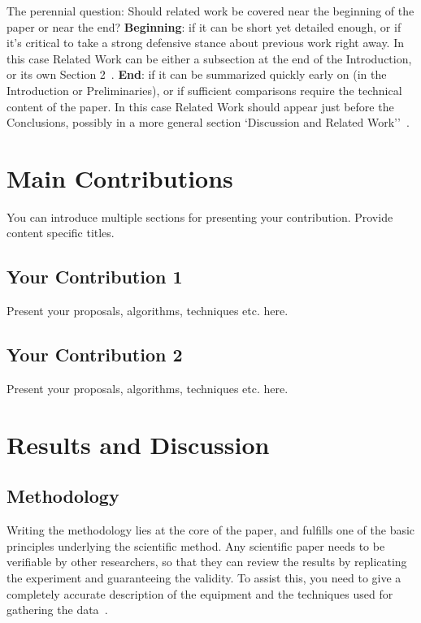 \documentclass{winslabreport}
\begin{document}
The perennial question: Should related work be covered near the beginning of the paper or near the end?
\textbf{Beginning}: if it can be short yet detailed enough, or if it's critical to take a strong defensive stance about previous work right away. In this case Related Work can be either a subsection at the end of the Introduction, or its own Section 2~\cite{Widom2006}. \textbf{End}: if it can be summarized quickly early on (in the Introduction or Preliminaries), or if sufficient comparisons require the technical content of the paper. In this case Related Work should appear just before the Conclusions, possibly in a more general section `Discussion and Related Work''~\cite{Widom2006}.


\section{Main Contributions}

You can introduce multiple sections for presenting your contribution. Provide content specific titles. 

\subsection{Your Contribution 1}

Present your proposals, algorithms, techniques etc. here.

\subsection{Your Contribution 2}

Present your proposals, algorithms, techniques etc. here.


\section{Results and Discussion}

\subsection{Methodology}
Writing the methodology lies at the core of the paper, and fulfills one of the basic principles underlying the scientific method. Any scientific paper needs to be verifiable by other researchers, so that they can review the results by replicating the experiment and guaranteeing the validity. To assist this, you need to give a completely accurate description of the equipment and the techniques used for gathering the data~\cite{Shuttleworth2016}.
\end{document}
